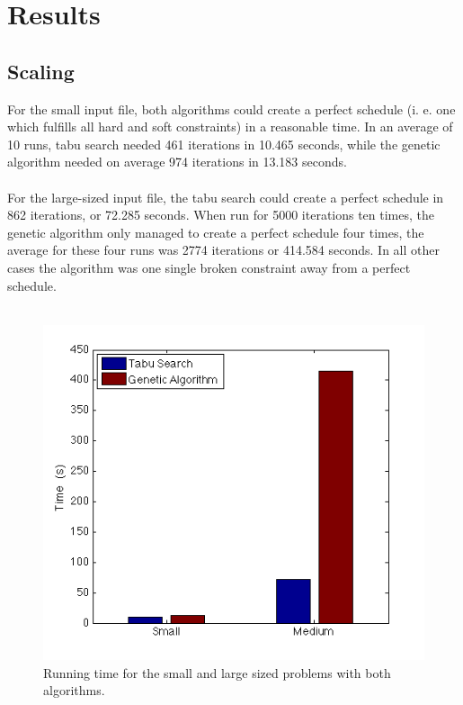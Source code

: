 \documentclass[titlepage,a4paper]{article}
\begin{document}
\pagebreak
\section{Results}
\subsection{Scaling}
For the small input file, both algorithms could create a perfect schedule (i. e. one which fulfills all hard and soft constraints) in a reasonable time. In an average of 10 runs, tabu search needed 461 iterations in 10.465 seconds, while the genetic algorithm needed on average 974 iterations in 13.183 seconds. \\\\
For the large-sized input file, the tabu search could create a perfect schedule in 862 iterations, or 72.285 seconds. When run for 5000 iterations ten times, the genetic algorithm only managed to create a perfect schedule four times, the average for these four runs was 2774 iterations or 414.584 seconds. In all other cases the algorithm was one single broken constraint away from a perfect schedule. \\\\

\begin{figure}[H]
  \centering
    \includegraphics[scale=0.5]{../results/time_bar_graph.png}
  \caption{Running time for the small and large sized problems with both algorithms.}
  \label{time_bar_graph}
\end{figure}
\end{document}

